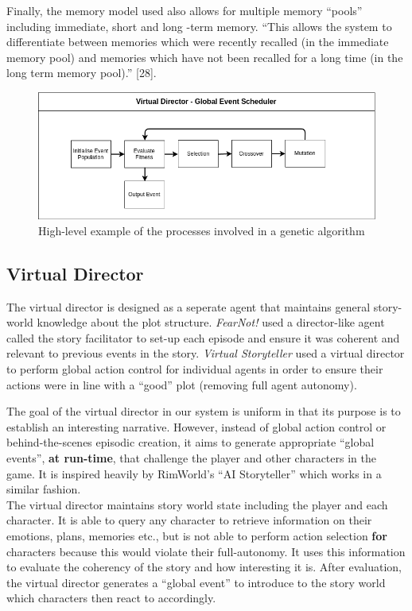 \documentclass{sig-alternate-05-2015}
\begin{document}
Finally, the memory model used also allows for multiple memory ``pools'' including immediate, short and long -term memory. ``This allows the system to differentiate between memories which were recently recalled (in the immediate memory pool) and memories which have not been recalled for a long time (in the long term memory pool).'' [28].

\begin{figure}[t]
\centering
\includegraphics[scale=0.33]{Images/GeneticDirector.png}
\caption{High-level example of the processes involved in a genetic algorithm}
\end{figure}

\subsection{Virtual Director}

\noindent The virtual director is designed as a seperate agent that maintains general story-world knowledge about the plot structure. \textit{FearNot!} used a director-like agent called the story facilitator to set-up each episode and ensure it was coherent and relevant to previous events in the story. \textit{Virtual Storyteller} used a virtual director to perform global action control for individual agents in order to ensure their actions were in line with a ``good'' plot (removing full agent autonomy).

The goal of the virtual director in our system is uniform in that its purpose is to establish an interesting narrative. However, instead of global action control or behind-the-scenes episodic creation, it aims to generate appropriate ``global events'', \textbf{at run-time}, that challenge the player and other characters in the game. It is inspired heavily by RimWorld's ``AI Storyteller'' which works in a similar fashion.\\

The virtual director maintains story world state including the player and each character. It is able to query any character to retrieve information on their emotions, plans, memories etc., but is not able to perform action selection \textbf{for} characters because this would violate their full-autonomy. It uses this information to evaluate the coherency of the story and how interesting it is. After evaluation, the virtual director generates a ``global event'' to introduce to the story world which characters then react to accordingly.
\end{document}
